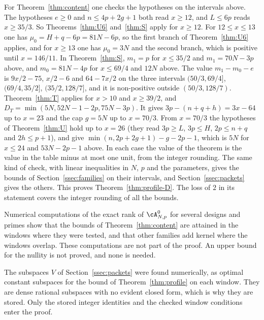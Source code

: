 For Theorem~\ref{thm:content} one checks the hypotheses on the intervals above. The hypotheses
$e\ge0$ and $n\le4p+2g+1$ both read $x\ge12$, and $L\le6p$ reads $x\ge35/3$. So Theorems~\ref{thm:U6}
and~\ref{thm:S} apply for $x\ge12$. For $12\le x\le13$ one has $\mu_0=H+q-6p=81N-6p$, so the first branch
of Theorem~\ref{thm:U6} applies, and for $x\ge13$ one has $\mu_0=3N$ and the second branch, which is positive
until $x=146/11$. In Theorem~\ref{thm:S}, $m_1=p$ for $x\le35/2$ and $m_1=70N-3p$ above, and
$m_0=81N-4p$ for $x\le69/4$ and $12N$ above. The value $m_1-m_0-e$ is $9x/2-75$, $x/2-6$ and
$64-7x/2$ on the three intervals $(50/3,69/4]$, $(69/4,35/2]$, $(35/2,128/7]$, and it is non-positive
outside $(50/3,128/7)$. Theorem~\ref{thm:T} applies for $x>10$ and $x\ge39/2$, and
$D_T=\min(5N,52N-1-2p,75N-3p)$. It gives $3p-(n+q+h)=3x-64$ up to $x=23$ and the cap $g=5N$ up to
$x=70/3$. From $x=70/3$ the hypotheses of Theorem~\ref{thm:U} hold up to $x=26$ (they read
$3p\ge L$, $3p\le H$, $2p\le n+q$ and $2h\le p+1$), and give $\min(n,2p+2g+1)-g-2p-1$, which is $5N$ for
$x\le24$ and $53N-2p-1$ above. In each case the value of the theorem is the value in the table minus at
most one unit, from the integer rounding. The same kind of check, with linear inequalities in $N$, $p$
and the parameters, gives the bounds of Section~\ref{ssec:families} on their intervals, and
Section~\ref{ssec:packets} gives the others. This proves Theorem~\ref{thm:profile-D}. The loss of $2$ in its
statement covers the integer rounding of all the bounds.

\begin{remark}
Numerical computations of the exact rank of $\cA^0_{N,p}$ for several designs and primes show that the
bounds of Theorem~\ref{thm:content} are attained in the windows where they were tested, and that other
families add kernel where the windows overlap. These computations are not part of the proof. An upper bound
for the nullity is not proved, and none is needed.
\end{remark}

\begin{remark}
The subspaces $V$ of Section~\ref{ssec:packets} were found numerically, as optimal constant subspaces for the
bound of Theorem~\ref{thm:profile} on each window. They are dense rational subspaces with no evident closed
form, which is why they are stored. Only the stored integer identities and the checked window conditions
enter the proof.
\end{remark}
